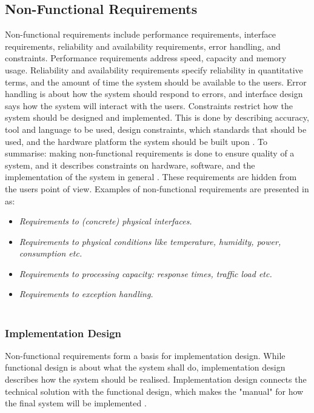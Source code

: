 \subsection{Non-Functional Requirements}
Non-functional requirements include performance requirements, interface requirements, reliability and availability requirements, error handling, and constraints. Performance requirements address speed, capacity and memory usage. Reliability and availability requirements specify reliability in quantitative terms, and the amount of time the system should be available to the users. Error handling is about how the system should respond to errors, and interface design says how the system will interact with the users. Constraints restrict how the system should be designed and implemented. This is done by describing accuracy, tool and language to be used, design constraints, which standards that should be used, and the hardware platform the system should be built upon \cite{braude2000software}. To summarise: making non-functional requirements is done to ensure quality of a system, and it describes constraints on hardware, software, and the implementation of the system in general \cite{mmi}. These requirements are hidden from the users point of view. Examples of non-functional requirements are presented in \cite{systemutviklingDel1} as:
\begin{itemize}
\item \emph{Requirements to (concrete) physical interfaces.}
\item \emph{Requirements to physical conditions like temperature, humidity, power, consumption etc.}
\item \emph{Requirements to processing capacity: response times, traffic load etc.}
\item \emph{Requirements to exception handling.} \\ \\ 
\end{itemize}   

\subsubsection{Implementation Design}
Non-functional requirements form a basis for implementation design. While functional design is about what the system shall do, implementation design describes how the system should be realised. Implementation design connects the technical solution with the functional design, which makes the "manual" for how the final system will be implemented \cite{systemutviklingDel1}.  

